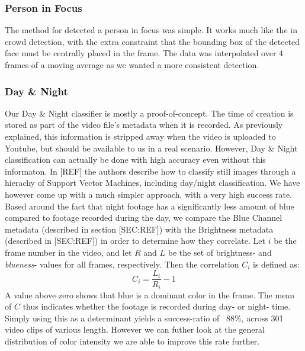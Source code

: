 \subsubsection{Person in Focus}
%
The method for detected a person in focus was simple. It works much like the in crowd detection, with the extra constraint that the bounding box of the detected face must be centrally placed in the frame.
%
%
The data was interpolated over 4 frames of a moving average as we wanted a more consistent detection.
%
%
%
\subsubsection{Day \& Night}
%
Our Day \& Night classifier is mostly a proof-of-concept. The time of creation is stored as part of the video file's metadata when it is recorded. As previously explained, this information is stripped away when the video is uploaded to Youtube, but should be available to us in a real scenario. However, Day \& Night classification can actually be done with high accuracy even without this informaton. In [REF] the authors describe how to classify still images through a hierachy of Support Vector Machines, including day/night classification. We have however come up with a much simpler approach, with a very high success rate.\\
Based around the fact that night footage has a significantly less amount of blue compared to footage recorded during the day, we compare the Blue Channel metadata (described in section [SEC:REF]) with the Brightness metadata (described in [SEC:REF]) in order to determine how they correlate. Let $i$ be the frame number in the video, and let $R$ and $L$ be the set of brightness- and \textit{blueness}- values for all frames, respectively. Then the correlation $C_{i}$ is defined as:\\
%
\begin{equation}
C_{i} = \frac{L_{i}}{R_{i}} - 1
\end{equation}
%
A value above zero shows that blue is a dominant color in the frame. The mean of $C$ thus indicates whether the footage is recorded during day- or night- time. Simply using this as a determinant yields a success-ratio of ~88\%, across 301 video clips of various length.
%
%
However we can futher look at the general distribution of color intensity we are able to improve this rate further.\\
